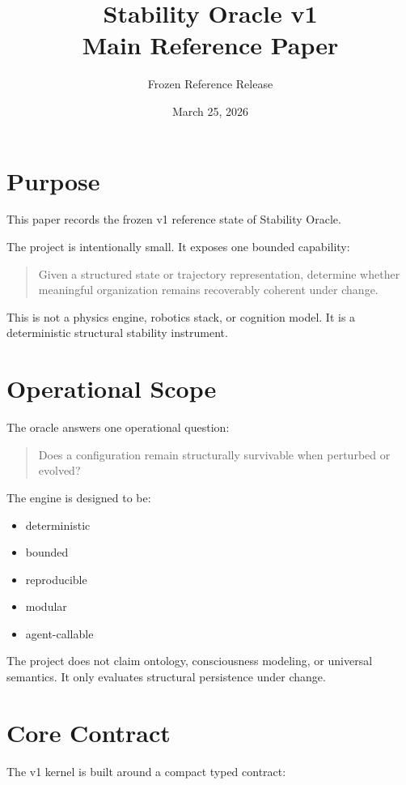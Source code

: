 \documentclass[11pt]{article}
\title{Stability Oracle v1\\Main Reference Paper}
\author{Frozen Reference Release}
\date{March 25, 2026}
\begin{document}
\maketitle
\tableofcontents
\newpage

\section{Purpose}

This paper records the frozen v1 reference state of Stability Oracle.

The project is intentionally small.
It exposes one bounded capability:

\begin{quote}
Given a structured state or trajectory representation, determine whether meaningful organization remains recoverably coherent under change.
\end{quote}

This is not a physics engine, robotics stack, or cognition model.
It is a deterministic structural stability instrument.

\section{Operational Scope}

The oracle answers one operational question:

\begin{quote}
Does a configuration remain structurally survivable when perturbed or evolved?
\end{quote}

The engine is designed to be:

\begin{itemize}
\item deterministic
\item bounded
\item reproducible
\item modular
\item agent-callable
\end{itemize}

The project does not claim ontology, consciousness modeling, or universal semantics.
It only evaluates structural persistence under change.

\section{Core Contract}

The v1 kernel is built around a compact typed contract:
\end{document}
